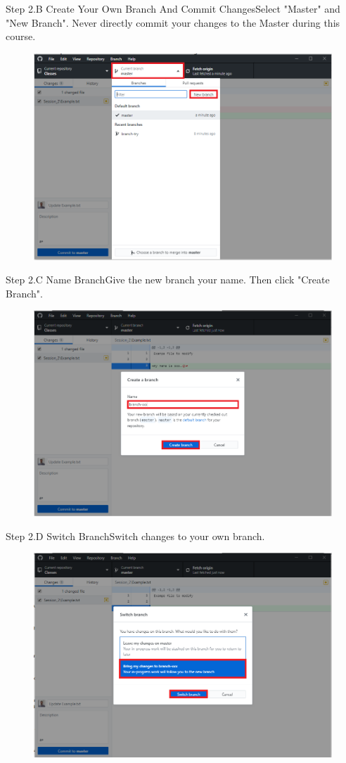 \documentclass[aspectratio=169]{beamer}
\begin{document}
\begin{frame}{Step 2.B Create Your Own Branch And Commit Changes}{Select "Master" and "New Branch". Never directly commit your changes to the Master during this course.}
	\begin{figure}
		\centering
		\includegraphics[width=0.7\linewidth]{../images/step2.B}
	\end{figure}
\end{frame}


\begin{frame}{Step 2.C Name Branch}{Give the new branch your name. Then click "Create Branch".}
	\begin{figure}
		\centering
		\includegraphics[width=0.7\linewidth]{../images/step2.C}
	\end{figure}
\end{frame}

\begin{frame}{Step 2.D Switch Branch}{Switch changes to your own branch.}
	\begin{figure}
		\centering
		\includegraphics[width=0.7\linewidth]{../images/step2.D}
	\end{figure}
\end{frame}
\end{document}
